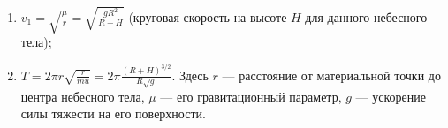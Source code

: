 \begin{enumerate}
	\item $v_1 = \sqrt{\frac{\mu}{r}} =
	\sqrt{\frac{gR^2}{R + H}}$
	(круговая скорость на высоте $H$ для данного небесного тела);
	\item $T = 2\pi r\sqrt{\frac{r}{mu}} =
	2\pi\frac{(R+H)^{ 3/2 }}{R\sqrt{g}}$.
	Здесь $r$ --- расстояние от материальной точки до центра небесного тела,
	$\mu$ --- его гравитационный параметр,
	$g$ ---	ускорение силы тяжести на его поверхности.
\end{enumerate}
